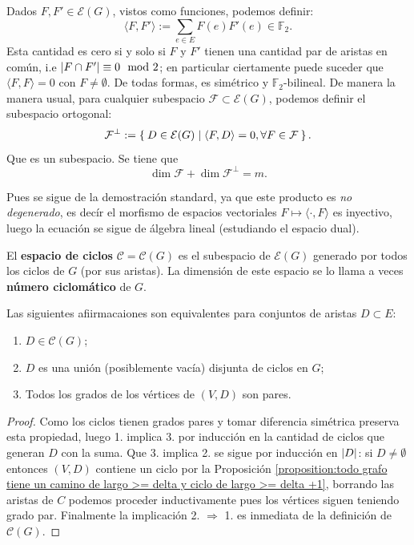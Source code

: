\documentclass[../main.tex]{subfiles}
\begin{document}
Dados $F,F' \in \mathcal{E} (G)$, vistos como funciones, podemos definir:
\[
    \langle F, F' \rangle := \sum_{e \in E} F (e) F'(e) \in \mathbb{F}_2.
\]
Esta cantidad es cero si y solo si $F$ y $F'$ tienen una cantidad par de aristas en común, i.e $\left \vert F \cap F' \right \vert \equiv 0 \mod 2$; en particular ciertamente puede suceder que $\langle F , F \rangle = 0$ con $F \neq \emptyset$. De todas formas, es simétrico y $\mathbb{F}_2$-bilineal.
De manera la manera usual, para cualquier subespacio $\mathcal{F} \subset \mathcal{E}(G)$, podemos definir el subespacio ortogonal:
\[
    \mathcal{F}^\perp := \Set{D \in \mathcal{E}(G) | \langle F , D \rangle = 0, \\ \forall F \in \mathcal{F}}.
\]
Que es un subespacio. Se tiene que
\begin{equation}\label{eq:formula de la dimension para los subsespacios ortogonales de E(G)}
\dim \mathcal{F} + \dim \mathcal{F}^\perp = m.
\end{equation}

Pues se sigue de la demostración standard, ya que este producto es \textit{no degenerado}, es decír el morfismo de espacios vectoriales $F \mapsto \langle \cdot, F \rangle$ es inyectivo, luego la ecuación se sigue de álgebra lineal (estudiando el espacio dual).

\begin{definition}
El \textbf{espacio de ciclos} $\mathcal{C} = \mathcal{C}(G)$ es el subespacio de $\mathcal{E}(G)$ generado por todos los ciclos de $G$ (por sus aristas). La dimensión de este espacio se lo llama a veces \textbf{número ciclomático} de $G$.
\end{definition}

\begin{proposition}\label{proposition:apendice - definiciones equivalentes de elemento del subespacio de ciclos}
Las siguientes afiirmacaiones son equivalentes para conjuntos de aristas $D \subset E$:
\begin{enumerate}[1.]
\item $D \in \mathcal{C} (G)$;
\item $D$ es una unión (posiblemente vacía) disjunta de ciclos en $G$;
\item Todos los grados de los vértices de $(V,D)$ son pares.
\end{enumerate}
\end{proposition}
\begin{proof}
Como los ciclos tienen grados pares y tomar diferencia simétrica preserva esta propiedad, luego 1. implica 3. por inducción en la cantidad de ciclos que generan $D$ con la suma. Que 3. implica 2. se sigue por inducción en $\left \vert D \right \vert$: si $D \neq \emptyset$ entonces $(V,D)$ contiene un ciclo por la Proposición \ref{proposition:todo grafo tiene un camino de largo >= delta y ciclo de largo >= delta +1}, borrando las aristas de $C$ podemos proceder inductivamente pues los vértices siguen teniendo grado par. Finalmente la implicación 2. $\Rightarrow$ 1. es inmediata de la definición de $\mathcal{C}(G)$.
\end{proof}
\end{document}
